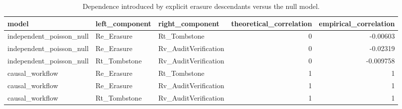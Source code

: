 \begin{table}[t]
\centering
\small
\caption{Dependence introduced by explicit erasure descendants versus the null model.}
\label{tab:causal-dependence}
\begin{tabular}{lllrr}
\toprule
model & left\_component & right\_component & theoretical\_correlation & empirical\_correlation \\
\midrule
independent\_poisson\_null & Re\_Erasure & Rt\_Tombstone & 0 & -0.00603 \\
independent\_poisson\_null & Re\_Erasure & Rv\_AuditVerification & 0 & -0.02319 \\
independent\_poisson\_null & Rt\_Tombstone & Rv\_AuditVerification & 0 & -0.009758 \\
causal\_workflow & Re\_Erasure & Rt\_Tombstone & 1 & 1 \\
causal\_workflow & Re\_Erasure & Rv\_AuditVerification & 1 & 1 \\
causal\_workflow & Rt\_Tombstone & Rv\_AuditVerification & 1 & 1 \\
\bottomrule
\end{tabular}
\end{table}

